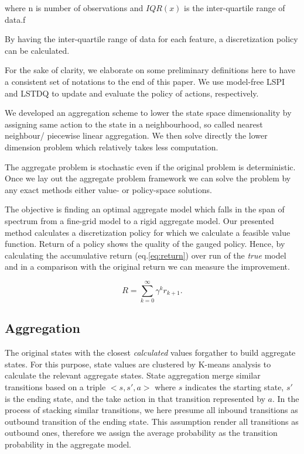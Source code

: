 \documentclass{article}
\begin{document}
    where n is number of observations and $IQR(x)$ is the inter-quartile range of data.f

    By having the inter-quartile range of data for each feature, a discretization policy can be calculated.


    For the sake of clarity, we elaborate on some preliminary definitions here to have a consistent set of notations
    to the end of this paper. We use model-free LSPI and LSTDQ \citep{Lagoudakis2003} to update and
    evaluate the policy of actions, respectively.

    We developed an aggregation scheme to lower the state space dimensionality by assigning same action to the state
    in a neighbourhood, so called nearest neighbour/ piecewise linear aggregation.
    We then solve directly the lower dimension problem which relatively takes less computation.

    The aggregate problem is stochastic even if the original problem is deterministic.
    Once we lay out the aggregate problem framework we can solve the problem by any exact methods either value- or
    policy-space solutions.


    The objective is finding an optimal aggregate model which falls in the span of spectrum from a fine-grid model
    to a rigid aggregate model.
    Our presented method calculates a discretization policy for which we calculate a feasible value function.
    Return of a policy shows the quality of the gauged policy.
    Hence, by calculating the accumulative return (eq.\ref{eq:return}) over run of the \textit{true} model and in a
    comparison with the original return we can measure the improvement.

    \begin{equation}
        R = \sum_{k=0}^{\infty} \gamma^{k} r_{k+1}. \label{eq:return}
    \end{equation}


    \subsection{Aggregation}
    The original states with the closest \textit{calculated} values forgather to build aggregate states.
    For this purpose, state values are clustered by K-means analysis to calculate the relevant aggregate states.
    State aggregation merge similar transitions based on a triple $<s, s', a>$ where $s$ indicates the starting state,
    $s'$ is the ending state, and the take action in that transition represented by $a$.
    In the process of stacking similar transitions, we here presume all inbound transitions as outbound transition of
    the ending state.
    This assumption render all transitions as outbound ones, therefore we assign the average probability as the
    transition probability in the aggregate model.
\end{document}
